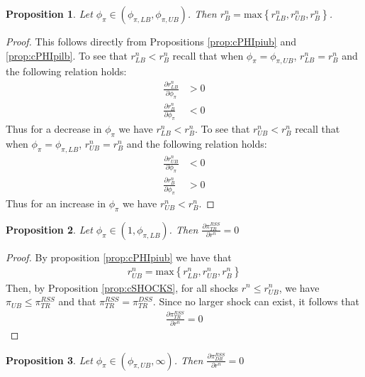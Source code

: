 \documentclass[11pt]{article}
\newtheorem{proposition}{Proposition}
\begin{document}
	\begin{proposition}\label{prop:cPHIpilbcPHIpiub}
		Let $\phi_{\pi}\in(\phi_{\pi,LB},\phi_{\pi,UB})$. Then $r^n_{B} = \text{max}\left\{r^n_{LB}, r^n_{UB}, r^n_{B}\right\}$. 
	\end{proposition}
	\begin{proof}
		This follows directly from Propositions \ref{prop:cPHIpiub} and \ref{prop:cPHIpilb}. 
		To see that $r^n_{LB} < r^n_{B}$ recall that when $\phi_{\pi} = \phi_{\pi,UB}$,  $r^n_{LB} = r^n_{B}$ and the following relation holds:
		\begin{align*}
			\frac{\partial r^n_{LB}}{\partial \phi_{\pi}} &> 0\\
			\frac{\partial r^n_{B}}{\partial \phi_{\pi}} & < 0
		\end{align*}
		Thus for a decrease in $\phi_{\pi}$ we have $r^n_{LB} < r^n_{B}$. 
		To see that $r^n_{UB} < r^n_{B}$ recall that when $\phi_{\pi} = \phi_{\pi,LB}$,  $r^n_{UB} = r^n_{B}$ and the following relation holds:
		\begin{align*}
			\frac{\partial r^n_{UB}}{\partial \phi_{\pi}} &< 0\\
			\frac{\partial r^n_{B}}{\partial \phi_{\pi}} & > 0
		\end{align*}
		Thus for an increase in $\phi_{\pi}$ we have $r^n_{UB} < r^n_{B}$. 
	\end{proof}
	\begin{proposition}\label{prop:pi_tr_zero}
		Let $\phi_{\pi}\in(1,\phi_{\pi,LB})$. Then $\frac{\partial\pi_{TR}^{RSS}}{\partial r^n} = 0 $ 
	\end{proposition}
	\begin{proof}
		By proposition \ref{prop:cPHIpiub} we have that 
		\begin{align*}
			r^n_{UB} = \text{max}\left\{r^n_{LB}, r^n_{UB}, r^n_{B}\right\}
		\end{align*}
		Then, by Proposition \ref{prop:cSHOCKS}, for all shocks $r^n\le r^n_{UB}$, we have $\pi_{UB} \le \pi_{TR}^{RSS}$ and that $\pi_{TR}^{RSS} = \pi_{TR}^{DSS}$. Since no larger shock can exist, it follows that 
		\begin{align*}
			\frac{\partial\pi_{TR}^{RSS}}{\partial r^n} = 0
		\end{align*}
	\end{proof}
	\begin{proposition}\label{prop:pi_dr_zero}
		Let $\phi_{\pi}\in(\phi_{\pi,UB},\infty)$. Then $\frac{\partial\pi_{DR}^{RSS}}{\partial r^n} = 0 $ 
	\end{proposition}
\end{document}

